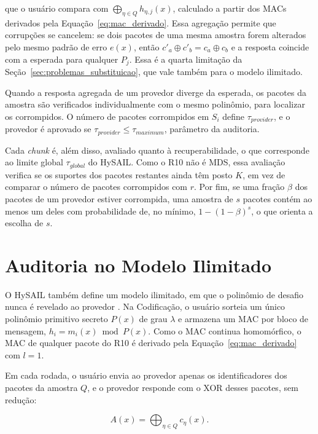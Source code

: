 \noindent que o usuário compara com $\bigoplus_{\eta \in Q} h_{\eta,j}(x)$, calculado a partir dos \acrshort{MAC}s derivados pela Equação~\eqref{eq:mac_derivado}. Essa agregação permite que corrupções se cancelem: se dois pacotes de uma mesma amostra forem alterados pelo mesmo padrão de erro $e(x)$, então $c'_a \oplus c'_b = c_a \oplus c_b$ e a resposta coincide com a esperada para qualquer $P_j$. Essa é a quarta limitação da Seção~\ref{sec:problemas_substituicao}, que vale também para o modelo ilimitado.

Quando a resposta agregada de um provedor diverge da esperada, os pacotes da amostra são verificados individualmente com o mesmo polinômio, para localizar os corrompidos. O número de pacotes corrompidos em $S_i$ define $\tau_{provider}$, e o provedor é aprovado se $\tau_{provider} \le \tau_{maximum}$, parâmetro da auditoria.

Cada \emph{chunk} é, além disso, avaliado quanto à recuperabilidade, o que corresponde ao limite global $\tau_{global}$ do HySAIL. Como o R10 não é MDS, essa avaliação verifica se os suportes dos pacotes restantes ainda têm posto $K$, em vez de comparar o número de pacotes corrompidos com $r$. Por fim, se uma fração $\beta$ dos pacotes de um provedor estiver corrompida, uma amostra de $s$ pacotes contém ao menos um deles com probabilidade de, no mínimo, $1 - (1 - \beta)^s$, o que orienta a escolha de $s$.

\section{Auditoria no Modelo Ilimitado}
\label{sec:auditoria_ilimitada}

O HySAIL também define um modelo ilimitado, em que o polinômio de desafio nunca é revelado ao provedor \cite{amaral2013hysail}. Na Codificação, o usuário sorteia um único polinômio primitivo secreto $P(x)$ de grau $\lambda$ e armazena um \acrshort{MAC} por bloco de mensagem, $h_i = m_i(x) \bmod P(x)$. Como o \acrshort{MAC} continua homomórfico, o \acrshort{MAC} de qualquer pacote do R10 é derivado pela Equação~\eqref{eq:mac_derivado} com $l = 1$.

Em cada rodada, o usuário envia ao provedor apenas os identificadores dos pacotes da amostra $Q$, e o provedor responde com o XOR desses pacotes, sem redução:

\begin{equation}
	A(x) = \bigoplus_{\eta \in Q} c_\eta(x).
	\label{eq:desafio_ilimitado}
\end{equation}

